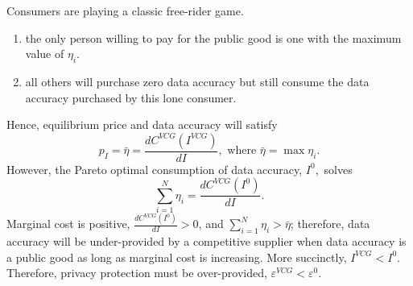 \documentclass[landscape]{baposter}
\begin{document}
\begin{poster}
{Consumers are playing a classic free-rider game.  
\begin{enumerate}
    \item the only person willing to pay for the public good is one with the maximum value of $%
\eta _{i}$.
    \item all others will purchase zero data accuracy but still consume the data accuracy purchased by this lone consumer. 
\end{enumerate}
Hence, equilibrium price and data accuracy will satisfy%
\begin{equation*}
    p_{I}=\bar{\eta}=\frac{dC^{VCG}\left( I^{VCG}\right) }{dI}, \text{ where } \bar{\eta} = \max \eta_i. 
\end{equation*}%
However, the Pareto optimal consumption of data accuracy, $I^{0},$ solves
\begin{equation}
    \sum_{i=1}^{N}\eta _{i}=\frac{dC^{VCG}\left( I^{0}\right) }{dI}.
    \label{eqn:pareto_optimality}
\end{equation}%
Marginal cost is positive, $\frac{dC^{VCG}\left( I^{0}\right) }{dI}>0$, and $%
\sum_{i=1}^{N}\eta _{i} > \bar{\eta}$; therefore, data accuracy will be
under-provided by a competitive supplier when data accuracy is a public good
as long as marginal cost is increasing. More
succinctly, $I^{VCG} < I^{0}$. Therefore, privacy protection must be
over-provided, $\varepsilon ^{VCG} < \varepsilon ^{0}$.





 
   }
   
   



\end{poster}
\end{document}
